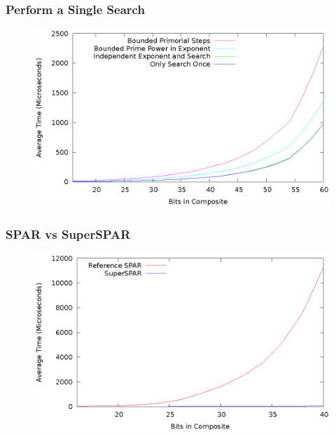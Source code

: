 \documentclass{beamer}
\begin{document}
\begin{frame}
\frametitle{Perform a Single Search}
\begin{figure}
\includegraphics[scale=0.86]{sspar-optimized}
\end{figure}
\end{frame}
\begin{frame}
\frametitle{SPAR vs SuperSPAR}
\begin{figure}
\includegraphics[scale=0.86]{spar-vs-sspar}
\end{figure}
\end{frame}
\end{document}
